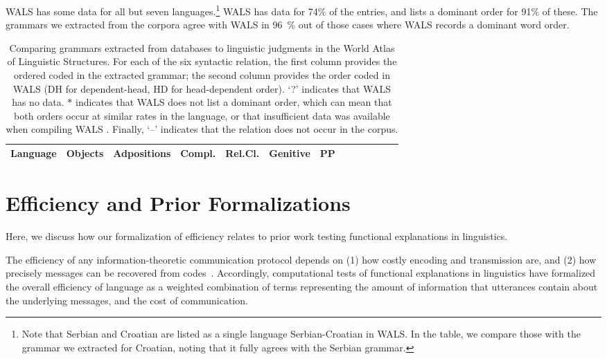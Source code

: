 \documentclass[10pt,twoside,lineno]{article}
\begin{document}
WALS has some data for all but seven languages.\footnote{Note that Serbian and Croatian are listed as a single language Serbian-Croatian in WALS. In the table, we compare those with the grammar we extracted for Croatian, noting that it fully agrees with the Serbian grammar.}
WALS has data for 74\% of the entries, and lists a dominant order for 91\% of these.
The grammars we extracted from the corpora agree with WALS in 96~\% out of those cases where WALS records a dominant word order.


\begin{table}[ht]
\small{
\begin{center}
\begin{tabular}{l||ll|ll|ll|ll|ll|ll|llllll}
		   Language 
		   &	\multicolumn{2}{|c|}{Objects} 
		   &	\multicolumn{2}{|c|}{Adpositions} 
		   &	\multicolumn{2}{|c|}{Compl.} 
		   &	\multicolumn{2}{|c|}{Rel.Cl.} 
		   &	\multicolumn{2}{|c|}{Genitive} 
		   &	\multicolumn{2}{|c|}{PP}  \\ \hline\hline
	
\end{tabular}
\end{center}
}
\caption{Comparing grammars extracted from databases to linguistic judgments in the World Atlas of Linguistic Structures. For each of the six syntactic relation, the first column provides the ordered coded in the extracted grammar; the second column provides the order coded in WALS (DH for dependent-head, HD for head-dependent order). `?' indicates that WALS has no data.
$*$ indicates that WALS does not list a dominant order, which can mean that both orders occur at similar rates in the language, or that insufficient data was available when compiling WALS \citep{dryer2011evidence}.
Finally, `--' indicates that the relation does not occur in the corpus.
}\label{tab:grammars-wals}
\end{table}






\section{Efficiency and Prior Formalizations}

Here, we discuss how our formalization of efficiency relates to prior work testing functional explanations in linguistics.

The efficiency of any information-theoretic communication protocol depends on (1) how costly encoding and transmission are, and (2) how precisely messages can be recovered from codes~\cite{shannon1948mathematical}.
Accordingly, computational tests of functional explanations in linguistics have formalized the overall efficiency of language as a weighted combination of terms representing the amount of information that utterances contain about the underlying messages, and the cost of communication.
\end{document}
